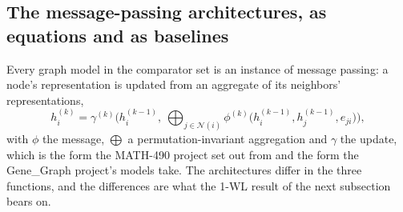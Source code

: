 \subsection{The message-passing architectures, as equations and as baselines}
\label{sec:mp-architectures}

Every graph model in the comparator set is an instance of message passing: a node's
representation is updated from an aggregate of its neighbors' representations,
\begin{equation}
  h_i^{(k)} = \gamma^{(k)}\Big(h_i^{(k-1)},\ \bigoplus_{j \in \mathcal{N}(i)}
  \phi^{(k)}\big(h_i^{(k-1)}, h_j^{(k-1)}, e_{ji}\big)\Big),
\end{equation}
with $\phi$ the message, $\bigoplus$ a permutation-invariant aggregation and $\gamma$
the update, which is the form the MATH-490 project set out from and the form the
Gene\_Graph project's models take. The architectures differ in the three functions,
and the differences are what the 1-WL result of the next subsection bears on.

